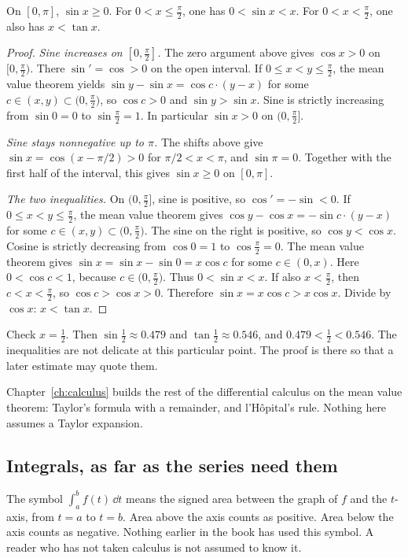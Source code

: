 \begin{proposition}\label{prop:sincmp}
On $[0,\pi]$, $\sin x\ge0$. For $0<x\le\frac\pi2$, one has $0<\sin x<x$. For $0<x<\frac\pi2$, one also has $x<\tan x$.
\end{proposition}
\begin{proof}
\emph{Sine increases on $[0,\frac\pi2]$.} The zero argument above gives $\cos x>0$ on $\bigl[0,\frac\pi2\bigr)$. There $\sin'=\cos>0$ on the open interval. If $0\le x<y\le\frac\pi2$, the mean value theorem yields $\sin y-\sin x=\cos c\cdot(y-x)$ for some $c\in(x,y)\subset\bigl(0,\frac\pi2\bigr)$, so $\cos c>0$ and $\sin y>\sin x$. Sine is strictly increasing from $\sin0=0$ to $\sin\frac\pi2=1$. In particular $\sin x>0$ on $\bigl(0,\frac\pi2\bigr]$.

\emph{Sine stays nonnegative up to $\pi$.} The shifts above give $\sin x=\cos(x-\pi/2)>0$ for $\pi/2<x<\pi$, and $\sin\pi=0$. Together with the first half of the interval, this gives $\sin x\ge0$ on $[0,\pi]$.

\emph{The two inequalities.} On $\bigl(0,\frac\pi2\bigr]$, sine is positive, so $\cos'=-\sin<0$. If $0\le x<y\le\frac\pi2$, the mean value theorem gives $\cos y-\cos x=-\sin c\cdot(y-x)$ for some $c\in(x,y)\subset\bigl(0,\frac\pi2\bigr)$. The sine on the right is positive, so $\cos y<\cos x$. Cosine is strictly decreasing from $\cos 0=1$ to $\cos\frac\pi2=0$. The mean value theorem gives $\sin x=\sin x-\sin0=x\cos c$ for some $c\in(0,x)$. Here $0<\cos c<1$, because $c\in\bigl(0,\frac\pi2\bigr)$. Thus $0<\sin x<x$. If also $x<\frac\pi2$, then $c<x<\frac\pi2$, so $\cos c>\cos x>0$. Therefore $\sin x=x\cos c>x\cos x$. Divide by $\cos x$: $x<\tan x$.
\end{proof}

Check $x=\frac12$. Then $\sin\frac12\approx0.479$ and $\tan\frac12\approx0.546$, and $0.479<\frac12<0.546$. The inequalities are not delicate at this particular point. The proof is there so that a later estimate may quote them.

Chapter~\ref{ch:calculus} builds the rest of the differential calculus on the mean value theorem: Taylor's formula with a remainder, and l'H\^opital's rule. Nothing here assumes a Taylor expansion.

\subsection*{Integrals, as far as the series need them}
The symbol $\int_a^b f(t)\,\dd t$ means the signed area between the graph of $f$ and the $t$-axis, from $t=a$ to $t=b$. Area above the axis counts as positive. Area below the axis counts as negative. Nothing earlier in the book has used this symbol. A reader who has not taken calculus is not assumed to know it.

